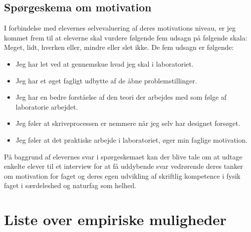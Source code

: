 \subsection{Spørgeskema om motivation}
\label{sub:3.2.a}
I forbindelse med elevernes selvevaluering af deres motivations niveau, er jeg kommet frem til at eleverne skal vurdere følgende fem udsagn på følgende skala: Meget, lidt, hverken eller, mindre eller slet ikke. De fem udsagn er følgende:
\begin{itemize}
	\item Jeg har let ved at gennemskue hvad jeg skal i laboratoriet.
 	\item Jeg har et øget fagligt udbytte af de åbne problemstillinger.
	\item Jeg har en bedre forståelse af den teori der arbejdes med som følge af laboratorie arbejdet.
	\item Jeg føler at skriveprocessen er nemmere når jeg selv har designet forsøget.
	\item Jeg føler at det praktiske arbejde i laboratoriet, øger min faglige motivation.
\end{itemize}
På baggrund af elevernes svar i spørgeskemaet kan der blive tale om at udtage enkelte elever til et interview for at få uddybende svar vedrørende deres tanker om motivation for faget og deres egen udvikling af skriftlig kompetence i fysik faget i særdeleshed og naturfag som helhed.

\section{Liste over empiriske muligheder}

